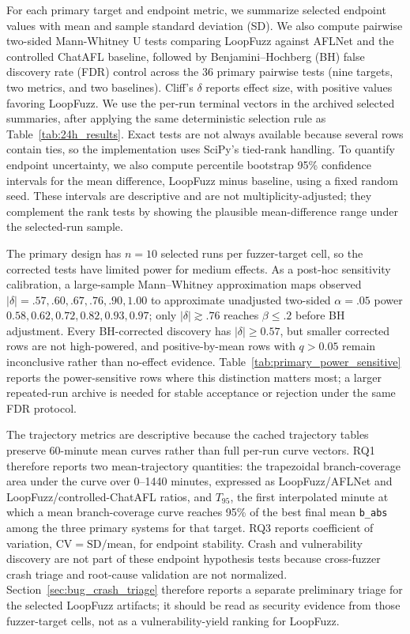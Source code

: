 \documentclass[final,5p,times,number]{elsarticle}
\begin{document}
For each primary target and endpoint metric, we summarize selected endpoint values with mean and sample standard deviation (SD). We also compute pairwise two-sided Mann-Whitney U tests comparing LoopFuzz against AFLNet and the controlled ChatAFL baseline, followed by Benjamini--Hochberg (BH) false discovery rate (FDR) control across the 36 primary pairwise tests (nine targets, two metrics, and two baselines). Cliff's $\delta$ reports effect size, with positive values favoring LoopFuzz. We use the per-run terminal vectors in the archived selected summaries, after applying the same deterministic selection rule as Table~\ref{tab:24h_results}. Exact tests are not always available because several rows contain ties, so the implementation uses SciPy's tied-rank handling. To quantify endpoint uncertainty, we also compute percentile bootstrap 95\% confidence intervals for the mean difference, LoopFuzz minus baseline, using a fixed random seed. These intervals are descriptive and are not multiplicity-adjusted; they complement the rank tests by showing the plausible mean-difference range under the selected-run sample.

The primary design has $n=10$ selected runs per fuzzer-target cell, so the corrected tests have limited power for medium effects. As a post-hoc sensitivity calibration, a large-sample Mann--Whitney approximation maps observed $|\delta|=.57,.60,.67,.76,.90,1.00$ to approximate unadjusted two-sided $\alpha=.05$ power $0.58,0.62,0.72,0.82,0.93,0.97$; only $|\delta|\gtrsim.76$ reaches $\beta\le.2$ before BH adjustment. Every BH-corrected discovery has $|\delta|\ge0.57$, but smaller corrected rows are not high-powered, and positive-by-mean rows with $q>0.05$ remain inconclusive rather than no-effect evidence. Table~\ref{tab:primary_power_sensitive} reports the power-sensitive rows where this distinction matters most; a larger repeated-run archive is needed for stable acceptance or rejection under the same FDR protocol.

The trajectory metrics are descriptive because the cached trajectory tables preserve 60-minute mean curves rather than full per-run curve vectors. RQ1 therefore reports two mean-trajectory quantities: the trapezoidal branch-coverage area under the curve over 0--1440 minutes, expressed as LoopFuzz/AFLNet and LoopFuzz/controlled-ChatAFL ratios, and $T_{95}$, the first interpolated minute at which a mean branch-coverage curve reaches 95\% of the best final mean \texttt{b\_abs} among the three primary systems for that target. RQ3 reports coefficient of variation, $\mathrm{CV}=\mathrm{SD}/\mathrm{mean}$, for endpoint stability. Crash and vulnerability discovery are not part of these endpoint hypothesis tests because cross-fuzzer crash triage and root-cause validation are not normalized. Section~\ref{sec:bug_crash_triage} therefore reports a separate preliminary triage for the selected LoopFuzz artifacts; it should be read as security evidence from those fuzzer-target cells, not as a vulnerability-yield ranking for LoopFuzz.
\end{document}
